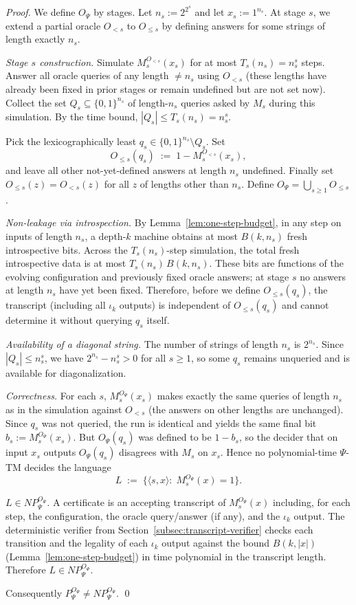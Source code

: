 \documentclass[11pt]{article}
\theoremstyle{definition}
\newcommand{\PSi}{\Psi}
\newcommand{\bits}{\{0,1\}}
\newcommand{\len}[1]{\left|#1\right|}
\begin{document}
\begin{proof}
We define $O_\PSi$ by stages. Let $n_s:=2^{2^{s}}$ and let $x_s:=1^{n_s}$. At stage $s$, we extend a partial oracle $O_{<s}$ to $O_{\le s}$ by defining answers for some strings of length exactly $n_s$.

\emph{Stage $s$ construction.} Simulate $M_s^{O_{<s}}(x_s)$ for at most $T_s(n_s)=n_s^{s}$ steps. Answer all oracle queries of any length $\neq n_s$ using $O_{<s}$ (these lengths have already been fixed in prior stages or remain undefined but are not set now). Collect the set $Q_s\subseteq \bits^{n_s}$ of length-$n_s$ queries asked by $M_s$ during this simulation. By the time bound, $|Q_s|\le T_s(n_s)=n_s^{s}$.

Pick the lexicographically least $q_s\in\bits^{n_s}\setminus Q_s$. Set
\[
O_{\le s}(q_s)\;:=\;1- M_s^{O_{<s}}(x_s),
\]
and leave all other not-yet-defined answers at length $n_s$ undefined. Finally set $O_{\le s}(z)=O_{<s}(z)$ for all $z$ of lengths other than $n_s$. Define $O_\PSi=\bigcup_{s\ge1} O_{\le s}$.

\emph{Non-leakage via introspection.} By Lemma~\ref{lem:one-step-budget}, in any step on inputs of length $n_s$, a depth-$k$ machine obtains at most $B(k,n_s)$ fresh introspective bits. Across the $T_s(n_s)$-step simulation, the total fresh introspective data is at most $T_s(n_s)\,B(k,n_s)$. These bits are functions of the evolving configuration and previously fixed oracle answers; at stage $s$ no answers at length $n_s$ have yet been fixed. Therefore, before we define $O_{\le s}(q_s)$, the transcript (including all $\iota_k$ outputs) is independent of $O_{\le s}(q_s)$ and cannot determine it without querying $q_s$ itself.

\emph{Availability of a diagonal string.} The number of strings of length $n_s$ is $2^{n_s}$. Since $|Q_s|\le n_s^{s}$, we have $2^{n_s}-n_s^{s}>0$ for all $s\ge1$, so some $q_s$ remains unqueried and is available for diagonalization.

\emph{Correctness.} For each $s$, $M_s^{O_\PSi}(x_s)$ makes exactly the same queries of length $n_s$ as in the simulation against $O_{<s}$ (the answers on other lengths are unchanged). Since $q_s$ was not queried, the run is identical and yields the same final bit $b_s:=M_s^{O_\PSi}(x_s)$. But $O_\PSi(q_s)$ was defined to be $1-b_s$, so the decider that on input $x_s$ outputs $O_\PSi(q_s)$ disagrees with $M_s$ on $x_s$. Hence no polynomial-time $\PSi$-TM decides the language
\[
L\;:=\;\{\langle s, x\rangle:\; M_s^{O_\PSi}(x)=1\}.
\]

\emph{$L\in NP^{O_\PSi}_\PSi$.} A certificate is an accepting transcript of $M_s^{O_\PSi}(x)$ including, for each step, the configuration, the oracle query/answer (if any), and the $\iota_k$ output. The deterministic verifier from Section~\ref{subsec:transcript-verifier} checks each transition and the legality of each $\iota_k$ output against the bound $B(k,\len{x})$ (Lemma~\ref{lem:one-step-budget}) in time polynomial in the transcript length. Therefore $L\in NP^{O_\PSi}_\PSi$.

Consequently $P^{O_\PSi}_\PSi \neq NP^{O_\PSi}_\PSi$. \qed
\end{proof}
\end{document}
